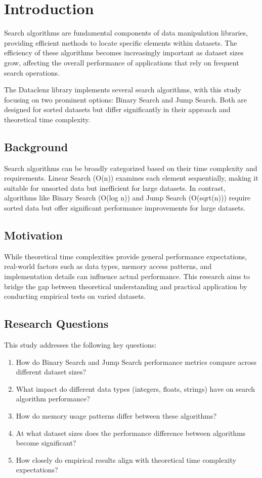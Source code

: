 \chapter{Introduction}

Search algorithms are fundamental components of data manipulation libraries, providing efficient methods to locate specific elements within datasets. The efficiency of these algorithms becomes increasingly important as dataset sizes grow, affecting the overall performance of applications that rely on frequent search operations.

The Dataclenz library implements several search algorithms, with this study focusing on two prominent options: Binary Search and Jump Search. Both are designed for sorted datasets but differ significantly in their approach and theoretical time complexity.

\section{Background}

Search algorithms can be broadly categorized based on their time complexity and requirements. Linear Search (O(n)) examines each element sequentially, making it suitable for unsorted data but inefficient for large datasets. In contrast, algorithms like Binary Search (O(log n)) and Jump Search (O(sqrt(n))) require sorted data but offer significant performance improvements for large datasets.

\section{Motivation}

While theoretical time complexities provide general performance expectations, real-world factors such as data types, memory access patterns, and implementation details can influence actual performance. This research aims to bridge the gap between theoretical understanding and practical application by conducting empirical tests on varied datasets.

\section{Research Questions}

This study addresses the following key questions:

\begin{enumerate}
    \item How do Binary Search and Jump Search performance metrics compare across different dataset sizes?
    \item What impact do different data types (integers, floats, strings) have on search algorithm performance?
    \item How do memory usage patterns differ between these algorithms?
    \item At what dataset sizes does the performance difference between algorithms become significant?
    \item How closely do empirical results align with theoretical time complexity expectations?
\end{enumerate}

